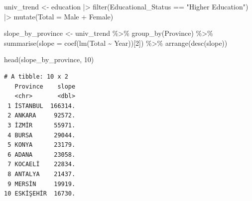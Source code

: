 \documentclass[
  11pt,
  a4paper,
  DIV=11,
  numbers=noendperiod]{scrartcl}
\newenvironment{Shaded}{\begin{snugshade}}{\end{snugshade}}
\newcommand{\AttributeTok}[1]{\textcolor[rgb]{0.40,0.45,0.13}{#1}}
\newcommand{\DecValTok}[1]{\textcolor[rgb]{0.68,0.00,0.00}{#1}}
\newcommand{\FunctionTok}[1]{\textcolor[rgb]{0.28,0.35,0.67}{#1}}
\newcommand{\NormalTok}[1]{\textcolor[rgb]{0.00,0.23,0.31}{#1}}
\newcommand{\OtherTok}[1]{\textcolor[rgb]{0.00,0.23,0.31}{#1}}
\newcommand{\SpecialCharTok}[1]{\textcolor[rgb]{0.37,0.37,0.37}{#1}}
\newcommand{\StringTok}[1]{\textcolor[rgb]{0.13,0.47,0.30}{#1}}
\begin{document}
\begin{Shaded}
\begin{Highlighting}[]
\NormalTok{univ\_trend }\OtherTok{\textless{}{-}}\NormalTok{ education }\SpecialCharTok{|\textgreater{}}
  \FunctionTok{filter}\NormalTok{(Educational\_Status }\SpecialCharTok{==} \StringTok{"Higher Education"}\NormalTok{) }\SpecialCharTok{|\textgreater{}}
  \FunctionTok{mutate}\NormalTok{(}\AttributeTok{Total =}\NormalTok{ Male }\SpecialCharTok{+}\NormalTok{ Female)}

\NormalTok{slope\_by\_province }\OtherTok{\textless{}{-}}\NormalTok{ univ\_trend }\SpecialCharTok{\%\textgreater{}\%}
  \FunctionTok{group\_by}\NormalTok{(Province) }\SpecialCharTok{\%\textgreater{}\%}
  \FunctionTok{summarise}\NormalTok{(}\AttributeTok{slope =} \FunctionTok{coef}\NormalTok{(}\FunctionTok{lm}\NormalTok{(Total }\SpecialCharTok{\textasciitilde{}}\NormalTok{ Year))[}\DecValTok{2}\NormalTok{]) }\SpecialCharTok{\%\textgreater{}\%}
  \FunctionTok{arrange}\NormalTok{(}\FunctionTok{desc}\NormalTok{(slope))}

\FunctionTok{head}\NormalTok{(slope\_by\_province, }\DecValTok{10}\NormalTok{)}
\end{Highlighting}
\end{Shaded}

\begin{verbatim}
# A tibble: 10 x 2
   Province    slope
   <chr>       <dbl>
 1 İSTANBUL  166314.
 2 ANKARA     92572.
 3 İZMİR      55971.
 4 BURSA      29044.
 5 KONYA      23179.
 6 ADANA      23058.
 7 KOCAELİ    22834.
 8 ANTALYA    21437.
 9 MERSİN     19919.
10 ESKİŞEHİR  16730.
\end{verbatim}
\end{document}
